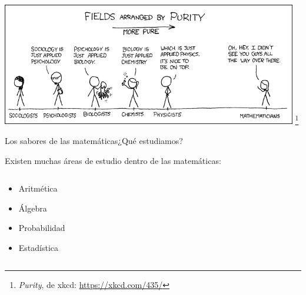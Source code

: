 \documentclass[spanish, handout]{beamer}
\newcommand\blfootnote[1]{%
\begingroup
\renewcommand\thefootnote{}\footnote{#1}%
\addtocounter{footnote}{-1}%
\endgroup
}
\begin{document}
\begin{frame}[plain]
    \begin{center}
        \includegraphics[width=0.97\textwidth]{../img/purity.png}
    \blfootnote{\textit{Purity}, de xkcd: \url{https://xkcd.com/435/}}
    \end{center}
\end{frame}

\begin{frame}{Los sabores de las matemáticas}{¿Qué estudiamos?}
    
    Existen muchas áreas de estudio dentro de las matemáticas: \pause

    \bigskip

    \begin{columns}
        \begin{column}{0.5\textwidth}
            \begin{itemize}
                \item<2-> \alert<7>{Aritmética}
                \item<3-> \alert<8>{Álgebra}
                \item<4-> \alert<9>{Probabilidad}
                \item<5-> \alert<10>{Estadística}
            \end{itemize}
        \end{column}
        \begin{column}{0.5\textwidth}
        \end{column}
    \end{columns}

    \bigskip
    
\end{frame}
\end{document}

